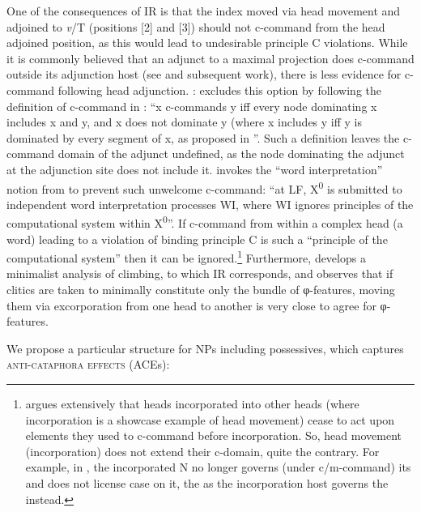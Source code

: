 \documentclass[output=paper,nonflat,colorlinks,citecolor=brown,newtxmath]{langsci/langscibook}
\begin{document}
One of the consequences of IR is that the index moved via head movement and adjoined to \textit{v}/T (positions [2] and [3]) should not c-command from the head adjoined position, as this would lead to undesirable principle C violations. While it is commonly believed that an adjunct to a maximal projection does c-command outside its adjunction host (see \citealt{kayne1994} and subsequent work), there is less evidence for c-command following head adjunction. \cite[93--94]{nikolaeva2014}: excludes this option by following the definition of c-command in \cite[574]{hestvik1992}: ``x c-commands y iff every node dominating x includes x and y, and x does not dominate y (where x includes y iff y is dominated by every segment of x, as proposed in \cite{may1985}''. Such a definition leaves the c-command domain of the adjunct undefined, as the node dominating the adjunct at the adjunction site does not include it. \cite{citkoetal2018} invokes the ``word interpretation'' notion from \cite[322]{chomsky1995} to prevent such unwelcome c-command: ``at LF, X\textsuperscript{0} is submitted to independent word interpretation processes WI, where WI ignores principles of the computational system within  X\textsuperscript{0}''. If c-command from within a complex head (a word) leading to a violation of binding principle C is such a ``principle of the computational system'' then it can be ignored.\footnote{\label{fn15}\cite{baker1988} argues extensively that heads incorporated into other heads (where incorporation is a showcase example of head movement) cease to act upon elements they used to c-command before incorporation. So, head movement (incorporation) does not extend their c-domain, quite the contrary. For example, in , the incorporated N no longer governs (under c/m-command) its  and does not license case on it, the  as the incorporation host governs the  instead.}
Furthermore, \cite{roberts2009} develops a minimalist analysis of  climbing, to which IR corresponds, and observes that if clitics are taken to minimally constitute only the bundle of φ-features, moving them via excorporation from one head to another is very close to agree for φ-features.

We propose a particular structure for NPs including possessives, which captures \textsc{anti-}\textsc{cataphora} \textsc{effects} (ACEs):

\z
\end{document}
